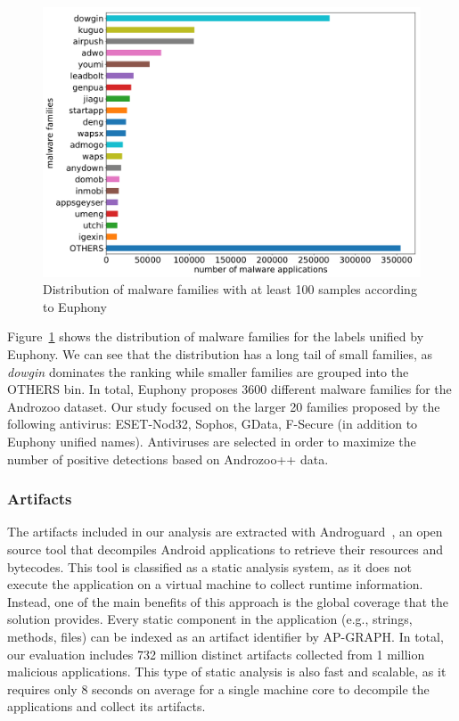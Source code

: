 \begin{figure}[!ht]
        \centering
	\includegraphics[width=0.85\linewidth]{figures/apgraph/euphony.pdf}
        \caption[Distribution of malware families with at least 100 samples]{Distribution of malware families with at least 100 samples according to Euphony}
	\label{figure:apgraph:families}
\end{figure}

Figure~\ref{figure:apgraph:families} shows the distribution of malware families for the labels unified by Euphony.
We can see that the distribution has a long tail of small families, as \textit{dowgin} dominates the ranking while smaller families are grouped into the OTHERS bin.
In total, Euphony proposes 3600 different malware families for the Androzoo dataset.
Our study focused on the larger 20 families proposed by the following antivirus: ESET-Nod32, Sophos, GData, F-Secure (in addition to Euphony unified names).
Antiviruses are selected in order to maximize the number of positive detections based on Androzoo++ data.
\subsubsection{Artifacts}
The artifacts included in our analysis are extracted with Androguard~\cite{desnos_androguard_nodate}, an open source tool that decompiles Android applications to retrieve their resources and bytecodes.
This tool is classified as a static analysis system, as it does not execute the application on a virtual machine to collect runtime information.
Instead, one of the main benefits of this approach is the global coverage that the solution provides.
Every static component in the application (e.g., strings, methods, files) can be indexed as an artifact identifier by AP-GRAPH.
In total, our evaluation includes 732 million distinct artifacts collected from 1 million malicious applications.
This type of static analysis is also fast and scalable, as it requires only 8 seconds on average for a single machine core to decompile the applications and collect its artifacts.

